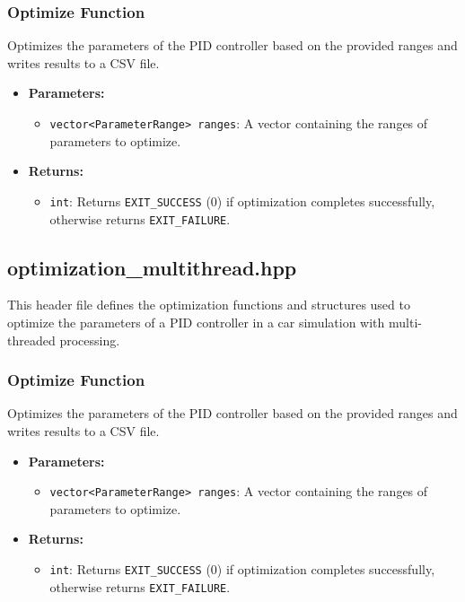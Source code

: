 \documentclass[a4paper,12pt]{./article}
\begin{document}
\subsubsection{Optimize Function}
Optimizes the parameters of the PID controller based on the provided ranges and writes results to a CSV file.
\begin{itemize}
\item \textbf{Parameters:}
\begin{itemize}
\item \texttt{vector<ParameterRange> ranges}: A vector containing the ranges of parameters to optimize.
\end{itemize}
\item \textbf{Returns:}
\begin{itemize}
\item \texttt{int}: Returns \texttt{EXIT\_SUCCESS} (0) if optimization completes successfully, otherwise returns \texttt{EXIT\_FAILURE}.
\end{itemize}
\end{itemize}
\subsection{optimization\_multithread.hpp}
This header file defines the optimization functions and structures used to optimize the parameters of a PID controller in a car simulation with multi-threaded processing.

\subsubsection{Optimize Function}
Optimizes the parameters of the PID controller based on the provided ranges and writes results to a CSV file.
\begin{itemize}
\item \textbf{Parameters:}
\begin{itemize}
\item \texttt{vector<ParameterRange> ranges}: A vector containing the ranges of parameters to optimize.
\end{itemize}
\item \textbf{Returns:}
\begin{itemize}
\item \texttt{int}: Returns \texttt{EXIT\_SUCCESS} (0) if optimization completes successfully, otherwise returns \texttt{EXIT\_FAILURE}.
\end{itemize}
\end{itemize}
\end{document}

